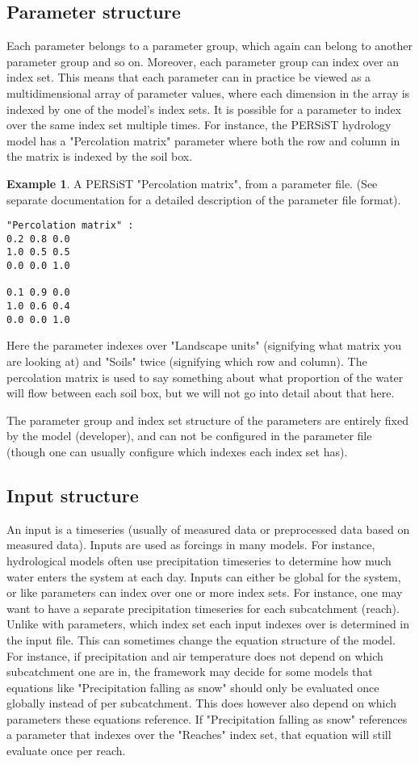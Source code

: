 \documentclass[11pt]{article}
\theoremstyle{definition}
\newtheorem{myexample}{Example}
\newenvironment{example}%
  {\begin{lrbox}{\examplebox}%
   \begin{minipage}{\dimexpr\linewidth-2\fboxsep}
   \begin{myexample}}%
  {\end{myexample}%
   \end{minipage}%
   \end{lrbox}%
   \begin{trivlist}
     \item[]\colorbox{silver}{\usebox\examplebox}
   \end{trivlist}}
\begin{document}
\subsection{Parameter structure}
Each parameter belongs to a parameter group, which again can belong to another parameter group and so on. Moreover, each parameter group can index over an index set. This means that each parameter can in practice be viewed as a multidimensional array of parameter values, where each dimension in the array is indexed by one of the model's index sets. It is possible for a parameter to index over the same index set multiple times. For instance, the PERSiST hydrology model \cite{futter14} has a "Percolation matrix" parameter where both the row and column in the matrix is indexed by the soil box.

\begin{example}
A PERSiST "Percolation matrix", from a parameter file. (See separate documentation for a detailed description of the parameter file format).
\begin{lstlisting}[style=textstyle]
"Percolation matrix" :
0.2 0.8 0.0
1.0 0.5 0.5
0.0 0.0 1.0

0.1 0.9 0.0
1.0 0.6 0.4
0.0 0.0 1.0
\end{lstlisting}
Here the parameter indexes over "Landscape units" (signifying what matrix you are looking at) and "Soils" twice (signifying which row and column). The percolation matrix is used to say something about what proportion of the water will flow between each soil box, but we will not go into detail about that here.
\end{example}

The parameter group and index set structure of the parameters are entirely fixed by the model (developer), and can not be configured in the parameter file (though one can usually configure which indexes each index set has).

\subsection{Input structure}
An input is a timeseries (usually of measured data or preprocessed data based on measured data). Inputs are used as forcings in many models. For instance, hydrological models often use precipitation timeseries to determine how much water enters the system at each day. Inputs can either be global for the system, or like parameters can index over one or more index sets. For instance, one may want to have a separate precipitation timeseries for each subcatchment (reach). Unlike with parameters, which index set each input indexes over is determined in the input file. This can sometimes change the equation structure of the model. For instance, if precipitation and air temperature does not depend on which subcatchment one are in, the framework may decide for some models that equations like "Precipitation falling as snow" should only be evaluated once globally instead of per subcatchment. This does however also depend on which parameters these equations reference. If "Precipitation falling as snow" references a parameter that indexes over the "Reaches" index set, that equation will still evaluate once per reach.
\end{document}
